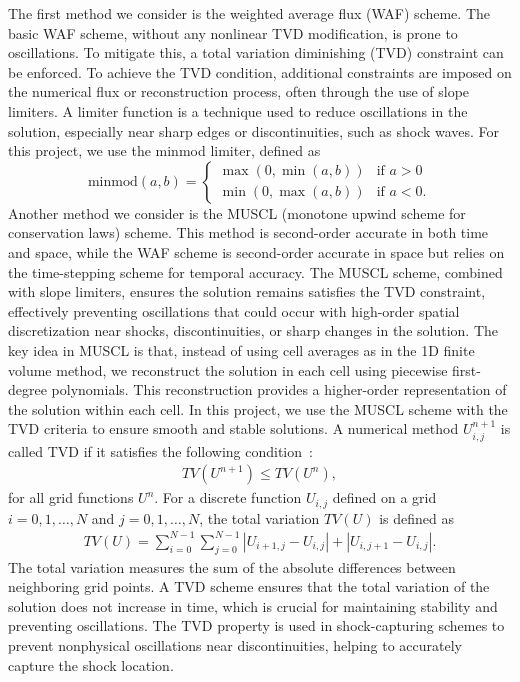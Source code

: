 The first method we consider is the weighted average flux (WAF) scheme.
The basic WAF scheme, without any nonlinear TVD modification, is prone to oscillations.
To mitigate this, a total variation diminishing (TVD) constraint can be enforced.
To achieve the TVD condition, additional constraints are imposed on the numerical flux or reconstruction process, often through the use of slope limiters.
A limiter function is a technique used to reduce oscillations in the solution, especially near sharp edges or discontinuities, such as shock waves.
For this project, we use the minmod limiter, defined as
\begin{equation*}
    \text{minmod}(a,b) = 
    \begin{cases}
        \max(0, \min(a,b)) & \text{if } a > 0 \\
        \min(0, \max(a,b)) & \text{if } a < 0. 
    \end{cases}
\end{equation*}
Another method we consider is the MUSCL (monotone upwind scheme for conservation laws) scheme.
This method is second-order accurate in both time and space, while the WAF scheme is second-order accurate in space but relies on the time-stepping scheme for temporal accuracy.
The MUSCL scheme, combined with slope limiters, ensures the solution remains satisfies the TVD constraint, effectively preventing oscillations that could occur with high-order spatial discretization near shocks, discontinuities, or sharp changes in the solution.
The key idea in MUSCL is that, instead of using cell averages as in the 1D finite volume method, we reconstruct the solution  in each cell using piecewise first-degree polynomials.
This reconstruction provides a higher-order representation of the solution within each cell.
In this project, we use the MUSCL scheme with the TVD criteria to ensure smooth and stable solutions.
A numerical method $U_{i,j}^{n+1} $ is called TVD if it satisfies the following condition~\cite{LeVeque_1992}:
\begin{align}
    TV(U^{n+1}) \leq TV(U^n),
\end{align}
for all grid functions $U^n$. 
For a discrete function $U_{i,j}$ defined on a grid $i = 0,1, \dots, N$ and $j=0,1, \dots, N$, the total variation $TV(U)$ is defined as
\begin{align}
    TV(U) = \sum_{i=0}^{N-1} \sum_{j=0}^{N-1}  |U_{i+1,j} - U_{i,j}| + |U_{i,j+1} - U_{i,j}|.
\end{align}
The total variation measures the sum of the absolute differences between neighboring grid points.
A TVD scheme ensures that the total variation of the solution does not increase in time, which is crucial for maintaining stability and preventing oscillations.
The TVD property is used in shock-capturing schemes to prevent nonphysical oscillations near discontinuities, helping to accurately capture the shock location.

